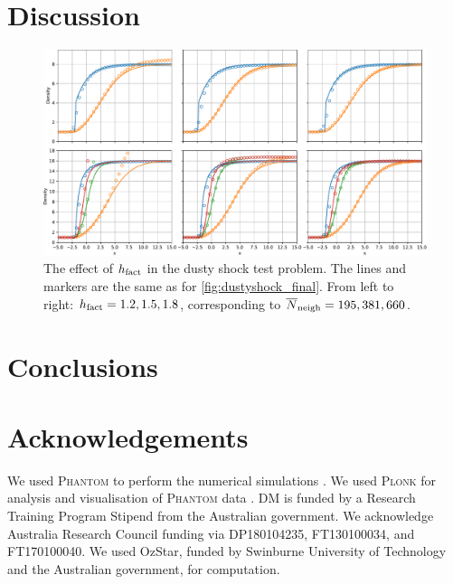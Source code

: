 \documentclass[fleqn,usenatbib]{mnras}
\begin{document}
\section{Discussion}%
\label{sec:discussion}

\begin{figure}
   \begin{center}
      \includegraphics[width=\textwidth]{figs/dustyshock_hfact.pdf}
      \caption{The effect of \(h_{\rm fact}\) in the dusty shock test problem.
         The lines and markers are the same as for \ref{fig:dustyshock_final}.
         From left to right: \(h_{\rm fact} = 1.2, 1.5, 1.8\), corresponding to
         \(\overline{N}_{\rm neigh} = 195, 381,
         660\).\label{fig:dustyshock_hfact}}
   \end{center}
\end{figure}


\section{Conclusions}


\section*{Acknowledgements}

We used \textsc{Phantom} to perform the numerical simulations
\citep{Price2018PASA...35...31P}. We used \textsc{Plonk} for analysis and
visualisation of \textsc{Phantom} data \citep{Mentiplay2019JOSS....4.1884M}. DM
is funded by a Research Training Program Stipend from the Australian government.
We acknowledge Australia Research Council funding via DP180104235, FT130100034,
and FT170100040. We used OzStar, funded by Swinburne University of Technology
and the Australian government, for computation.


\end{document}
